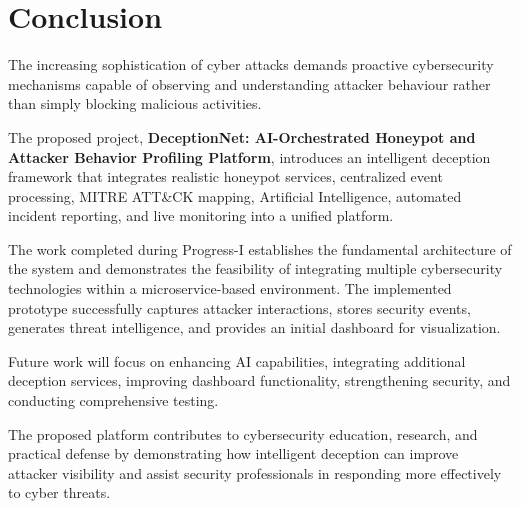 \documentclass[12pt,a4paper]{report}
\begin{document}

\chapter{Conclusion}

The increasing sophistication of cyber attacks demands proactive cybersecurity mechanisms capable of observing and understanding attacker behaviour rather than simply blocking malicious activities.

The proposed project, \textbf{DeceptionNet: AI-Orchestrated Honeypot and Attacker Behavior Profiling Platform}, introduces an intelligent deception framework that integrates realistic honeypot services, centralized event processing, MITRE ATT\&CK mapping, Artificial Intelligence, automated incident reporting, and live monitoring into a unified platform.

The work completed during Progress-I establishes the fundamental architecture of the system and demonstrates the feasibility of integrating multiple cybersecurity technologies within a microservice-based environment. The implemented prototype successfully captures attacker interactions, stores security events, generates threat intelligence, and provides an initial dashboard for visualization.

Future work will focus on enhancing AI capabilities, integrating additional deception services, improving dashboard functionality, strengthening security, and conducting comprehensive testing.

The proposed platform contributes to cybersecurity education, research, and practical defense by demonstrating how intelligent deception can improve attacker visibility and assist security professionals in responding more effectively to cyber threats.

\end{document}
